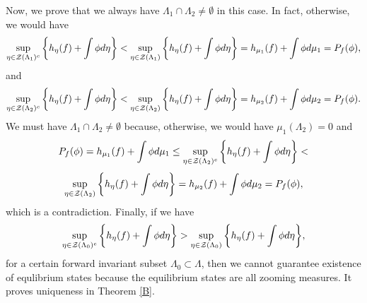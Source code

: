 \documentclass[12pt,a4paper]{amsart}
\theoremstyle{plain}
\begin{document}
Now, we prove that we always have $\Lambda_{1}\cap \Lambda_{2} \neq \emptyset$ in this case. In fact, otherwise, we would have
\[
\sup_{\eta \in \mathcal{Z}(\Lambda_{1})^{c}} \bigg{\{} h_{\eta}(f) + \int \phi d\eta \bigg{\}} < \sup_{\eta \in \mathcal{Z}(\Lambda_{1})} \bigg{\{} h_{\eta}(f) + \int \phi d\eta\bigg{\}} = h_{\mu_{1}}(f) + \int \phi d\mu_{1}= P_{f}(\phi),
\]
and
\[
\sup_{\eta \in \mathcal{Z}(\Lambda_{2})^{c}} \bigg{\{} h_{\eta}(f) + \int \phi d\eta \bigg{\}} < \sup_{\eta \in \mathcal{Z}(\Lambda_{2})} \bigg{\{} h_{\eta}(f) + \int \phi d\eta \bigg{\}} = h_{\mu_{2}}(f) + \int \phi d\mu_{2} = P_{f}(\phi).
\]
We must have $\Lambda_{1} \cap \Lambda_{2} \neq \emptyset$ because, otherwise, we would have $\mu_{1}(\Lambda_{2}) = 0$ and
\[
P_{f}(\phi) = h_{\mu_{1}}(f) + \int \phi d\mu_{1} \leq \sup_{\eta \in \mathcal{Z}(\Lambda_{2})^{c}} \bigg{\{} h_{\eta}(f) + \int \phi d\eta \bigg{\}} < 
\]
\[
\sup_{\eta \in \mathcal{Z}(\Lambda_{2})} \bigg{\{} h_{\eta}(f) + \int \phi d\eta \bigg{\}} = h_{\mu_{2}}(f) + \int \phi d\mu_{2}= P_{f}(\phi),
\]
which is a contradiction. Finally, if we have
\[
\sup_{\eta \in \mathcal{Z}(\Lambda_{0})^{c}} \bigg{\{} h_{\eta}(f) + \int \phi d\eta \bigg{\}} > \sup_{\eta \in \mathcal{Z}(\Lambda_{0})} \bigg{\{} h_{\eta}(f) + \int \phi d\eta \bigg{\}},
\]
for a certain forward invariant subset $\Lambda_{0} \subset \Lambda$, then we cannot guarantee existence of equlibrium states because the equilibrium states are all zooming measures. It proves uniqueness in Theorem \ref{B}.
\end{document}
